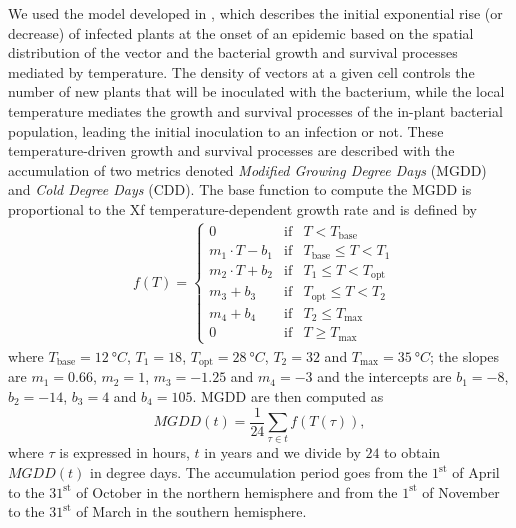 We used the model developed in \cite{GimenezRomero2022_CommsBio}, which
describes
the initial exponential rise (or decrease) of infected plants at the onset of
an epidemic based on the spatial distribution of the vector and the bacterial
growth and survival processes mediated by temperature. The density of vectors
at a given cell controls the number of new plants that will be inoculated with
the bacterium, while the local temperature mediates the growth and survival
processes of the in-plant bacterial population, leading the initial inoculation
to an infection or not. These temperature-driven growth and survival processes
are described with the accumulation of two metrics denoted \textit{Modified
    Growing Degree Days} (MGDD) and \textit{Cold Degree Days} (CDD). The base
function to compute the MGDD is proportional to the Xf temperature-dependent
growth rate and is defined by
\begin{align*}
     & f(T)=\left\{\begin{array}{lll}
                       0                & \textrm{if} & T<T_{\textrm{base}}
                       \\
                       m_1\cdot T-b_1   & \textrm{if} & T_{\textrm{base}} \leq
                       T < T_1
                       \\
                       m_2\cdot T + b_2 & \textrm{if} & T_{1} \leq T <
                       T_{\textrm{opt}}
                       \\
                       m_3 + b_3        & \textrm{if} & T_{\textrm{opt}} \leq T
                       < T_2
                       \\
                       m_4 + b_4        & \textrm{if} & T_2 \leq
                       T_{\textrm{max}}
                       \\
                       0                & \textrm{if} & T\geq T_{\textrm{max}}
                   \end{array}\right. \,
\end{align*}
where $T_{\textrm{base}}=\SI{12}{\degree C}$, $T_1=18$,
$T_{\textrm{opt}}=\SI{28}{\degree C}$,	$T_2=32$ and
$T_{\textrm{max}}=\SI{35}{\degree C}$; the slopes are $m_1= 0.66$, $m_2=1$,
$m_3=-1.25$ and $m_4=-3$ and the intercepts are $b_1=-8$, $b_2=-14$, $b_3=4$
and $b_4=105$. MGDD are then computed as
\begin{equation}\label{eq:MGDDdef}
    MGDD(t) = \frac{1}{24}\sum_{\tau \in t} f(T(\tau)),
\end{equation}
where $\tau$ is expressed in hours, $t$ in years and we divide by $24$ to
obtain $MGDD(t)$ in degree days. The accumulation period goes from the
$1^{\mathrm{st}}$ of April to the $31^{\mathrm{st}}$ of October in the northern
hemisphere and from the $1^{\mathrm{st}}$ of November to the $31^{\mathrm{st}}$
of March in the southern hemisphere.

